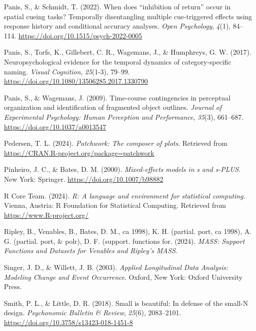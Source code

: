 \documentclass[
  man, donotrepeattitle,floatsintext]{apa6}
\newlength{\cslhangindent}
\newenvironment{CSLReferences}[2] %
 {\begin{list}{}{%
  \setlength{\itemindent}{0pt}
  \setlength{\leftmargin}{0pt}
  \setlength{\parsep}{0pt}
  \ifodd #1
   \setlength{\leftmargin}{\cslhangindent}
   \setlength{\itemindent}{-1\cslhangindent}
  \fi
  \setlength{\itemsep}{#2\baselineskip}}}
 {\end{list}}
\begin{document}
\begin{CSLReferences}{1}{0}
Panis, S., \& Schmidt, T. (2022). When does {``inhibition of return''} occur in spatial cueing tasks? {Temporally} disentangling multiple cue-triggered effects using response history and conditional accuracy analyses. \emph{Open Psychology}, \emph{4}(1), 84--114. \url{https://doi.org/10.1515/psych-2022-0005}

Panis, S., Torfs, K., Gillebert, C. R., Wagemans, J., \& Humphreys, G. W. (2017). Neuropsychological evidence for the temporal dynamics of category-specific naming. \emph{Visual Cognition}, \emph{25}(1-3), 79--99. \url{https://doi.org/10.1080/13506285.2017.1330790}

Panis, S., \& Wagemans, J. (2009). Time-course contingencies in perceptual organization and identification of fragmented object outlines. \emph{Journal of Experimental Psychology: Human Perception and Performance}, \emph{35}(3), 661--687. \url{https://doi.org/10.1037/a0013547}

Pedersen, T. L. (2024). \emph{Patchwork: The composer of plots}. Retrieved from \url{https://CRAN.R-project.org/package=patchwork}

Pinheiro, J. C., \& Bates, D. M. (2000). \emph{Mixed-effects models in s and s-PLUS}. New York: Springer. \url{https://doi.org/10.1007/b98882}

R Core Team. (2024). \emph{R: A language and environment for statistical computing}. Vienna, Austria: R Foundation for Statistical Computing. Retrieved from \url{https://www.R-project.org/}

Ripley, B., Venables, B., Bates, D. M., ca 1998), K. H. (partial. port, ca 1998), A. G. (partial. port, \& polr), D. F. (support. functions for. (2024). \emph{{MASS}: {Support Functions} and {Datasets} for {Venables} and {Ripley}'s {MASS}}.

Singer, J. D., \& Willett, J. B. (2003). \emph{Applied {Longitudinal Data Analysis}: {Modeling Change} and {Event Occurrence}}. Oxford, New York: Oxford University Press.

Smith, P. L., \& Little, D. R. (2018). Small is beautiful: {In} defense of the small-{N} design. \emph{Psychonomic Bulletin \& Review}, \emph{25}(6), 2083--2101. \url{https://doi.org/10.3758/s13423-018-1451-8}


\end{CSLReferences}
\end{document}
